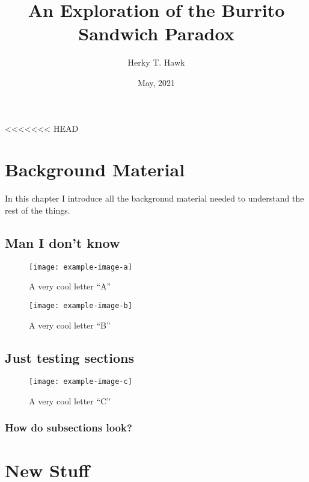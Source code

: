 \documentclass[letterpaper, openany, 12pt, oneside]{uithesis}
\title{An Exploration of the Burrito Sandwich Paradox}
\author{Herky T. Hawk}
\date{May, 2021}
\begin{document}
\titlepage

\copyrightPage

\frontmatter








\tableofcontents*

\listoffigures

\listoftables

\mainmatter

<<<<<<< HEAD
\chapter{Background Material}

In this chapter I introduce all the backgronud material needed to understand the
rest of the things.

\section{Man I don't know}
\begin{figure}
	\centering
	\label{fig:one}
	\caption{A very cool letter ``A''}
	\texttt{[image: example-image-a]}
\end{figure}
\lipsum[1-5]
\begin{figure}
	\centering
	\label{fig:two}
	\caption{A very cool letter ``B''}
	\texttt{[image: example-image-b]}
\end{figure}
\lipsum[6-10]

\section{Just testing sections}
\begin{figure}[!htb]
	\centering
	\label{fig:three}
	\caption{A very cool letter ``C''}
	\texttt{[image: example-image-c]}
\end{figure}
\lipsum[11-15]

\subsection{How do subsections look?}
\lipsum[75]


\chapter{New Stuff}
\lipsum[21-40]
\end{document}

